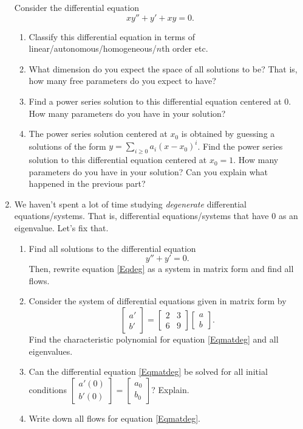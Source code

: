 \documentclass[letter]{article}
\newcommand{\mat}[1]{\begin{bmatrix}#1\end{bmatrix}}
\begin{document}
\begin{enumerate}
			Consider the differential equation
			\[
				xy''+y'+xy=0.
			\]
			\begin{enumerate}
				\item Classify this differential equation in terms of linear/autonomous/homogeneous/$n$th order etc.
				\item What dimension do you expect the space of all solutions to be?  That is, how many free
					parameters do you expect to have?
				\item Find a power series solution to this differential equation centered at $0$.  How many
					parameters do you have in your solution?
				\item The power series solution centered at $x_0$ is obtained by guessing a solutions of the
					form $y=\sum_{i\geq 0} a_i(x-x_0)^i$.  Find the power series solution to this 
					differential equation centered at $x_0=1$.  How many parameters do you have in your solution?
					Can you explain what happened in the previous part?
			\end{enumerate}
		\item We haven't spent a lot of time studying \emph{degenerate} differential equations/systems.  That is,
			differential equations/systems that have $0$ as an eigenvalue.  Let's fix that.
			\begin{enumerate}
				\item Find all solutions to the differential equation
					\begin{equation}
						\label{Eqdeg}
						y''+y'=0.
					\end{equation}
					Then, rewrite equation \eqref{Eqdeg} as a system in matrix form and find all flows.
				\item Consider the system of differential equations given in matrix form by
					\begin{equation}
						\label{Eqmatdeg}
						\mat{a'\\b'} = \mat{2&3\\6&9}\mat{a\\b}.
					\end{equation}
					Find the characteristic polynomial for equation \eqref{Eqmatdeg} and all eigenvalues.
				\item Can the differential equation \eqref{Eqmatdeg} be solved for all initial conditions
					$\mat{a'(0)\\b'(0)}=\mat{a_0\\b_0}$?  Explain.
				\item Write down all flows for equation \eqref{Eqmatdeg}.
			\end{enumerate}

\end{enumerate}
\end{document}
